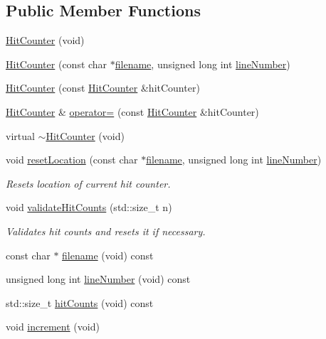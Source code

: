 \subsection*{Public Member Functions}
\begin{DoxyCompactItemize}
\item 
\hyperlink{classel_1_1base_1_1_hit_counter_a2d32056aa55d080c2a2c534713b9a9a7}{Hit\+Counter} (void)
\item 
\hyperlink{classel_1_1base_1_1_hit_counter_a1fe641f45123641012673f8bc29aefd8}{Hit\+Counter} (const char $\ast$\hyperlink{classel_1_1base_1_1_hit_counter_ad04433d214c175775ed61453ead374fc}{filename}, unsigned long int \hyperlink{classel_1_1base_1_1_hit_counter_ab43602346f499854b1764b1c2dcb70dc}{line\+Number})
\item 
\hyperlink{classel_1_1base_1_1_hit_counter_abae187cf5ea0f94e812223ee4be7061f}{Hit\+Counter} (const \hyperlink{classel_1_1base_1_1_hit_counter}{Hit\+Counter} \&hit\+Counter)
\item 
\hyperlink{classel_1_1base_1_1_hit_counter}{Hit\+Counter} \& \hyperlink{classel_1_1base_1_1_hit_counter_ad32a5e5c2a63ff30fa9d298613d746d1}{operator=} (const \hyperlink{classel_1_1base_1_1_hit_counter}{Hit\+Counter} \&hit\+Counter)
\item 
virtual \hyperlink{classel_1_1base_1_1_hit_counter_a8ff49793a4baef0a9ed0320f7d7db513}{$\sim$\+Hit\+Counter} (void)
\item 
void \hyperlink{classel_1_1base_1_1_hit_counter_af58479cb66b71a76a3f8fd26193bfde1}{reset\+Location} (const char $\ast$\hyperlink{classel_1_1base_1_1_hit_counter_ad04433d214c175775ed61453ead374fc}{filename}, unsigned long int \hyperlink{classel_1_1base_1_1_hit_counter_ab43602346f499854b1764b1c2dcb70dc}{line\+Number})
\begin{DoxyCompactList}\small\item\em Resets location of current hit counter. \end{DoxyCompactList}\item 
void \hyperlink{classel_1_1base_1_1_hit_counter_a04dcca0a3f1b1f9a0ef8d812f00cecf0}{validate\+Hit\+Counts} (std\+::size\+\_\+t n)
\begin{DoxyCompactList}\small\item\em Validates hit counts and resets it if necessary. \end{DoxyCompactList}\item 
const char $\ast$ \hyperlink{classel_1_1base_1_1_hit_counter_ad04433d214c175775ed61453ead374fc}{filename} (void) const 
\item 
unsigned long int \hyperlink{classel_1_1base_1_1_hit_counter_ab43602346f499854b1764b1c2dcb70dc}{line\+Number} (void) const 
\item 
std\+::size\+\_\+t \hyperlink{classel_1_1base_1_1_hit_counter_a3df3a285c91b5eb690be48893d677e94}{hit\+Counts} (void) const 
\item 
void \hyperlink{classel_1_1base_1_1_hit_counter_ae2d7709a89362019195761416d510911}{increment} (void)
\end{DoxyCompactItemize}


